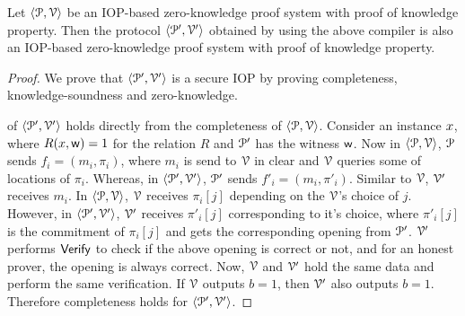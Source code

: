 \begin{lemma}\label{lemma:compiler}
	Let $\langle \mathcal{P},\mathcal{V}\rangle$ be an IOP-based zero-knowledge proof system with proof of knowledge property. Then the protocol $\langle \mathcal{P}',\mathcal{V}'\rangle$ obtained by using the above compiler is also an IOP-based zero-knowledge proof system with proof of knowledge property.
\end{lemma}
\begin{proof}
	
%	
%	
	
	We prove that $\langle \mathcal{P}',\mathcal{V}'\rangle$ is a secure IOP by proving completeness, knowledge-soundness and zero-knowledge.
	
	
	 of $\langle \mathcal{P}', \mathcal{V}' \rangle$ holds directly from the completeness of $\langle \mathcal{P}, \mathcal{V} \rangle$. 
	Consider an instance ${x}$, where $R({x},\mathsf{w}) = 1$ for the relation $R$ and $\mathcal{P}'$ has the witness $\mathsf{w}$. 
	Now in $\langle \mathcal{P},\mathcal{V}\rangle$, $\mathcal{P}$ sends $f_i = (m_i, \pi_i)$, where $m_i$ is send to $\mathcal{V}$ in clear and $\mathcal{V}$ queries some of locations of $\pi_i$. Whereas, in $\langle \mathcal{P}',\mathcal{V}'\rangle$, $\mathcal{P}'$ sends $f'_i = (m_i, \pi'_i)$. 
	Similar to $\mathcal{V}$, $\mathcal{V}'$ receives $m_i$. In $\langle \mathcal{P},\mathcal{V}\rangle$, $\mathcal{V}$ receives $\pi_i[j]$ depending on the $\mathcal{V}$'s choice of $j$. 
	However, in $\langle \mathcal{P}',\mathcal{V}'\rangle$, $\mathcal{V}'$ receives $\pi'_i[j]$ corresponding to it's choice, where $\pi'_i[j]$ is the commitment of $\pi_i[j]$ and gets the corresponding opening from $\mathcal{P}'$. 
	$\mathcal{V}'$ performs $\mathsf{Verify}$ to check if the above opening is correct or not, and for an honest prover, the opening is always correct.
	Now, $\mathcal{V}$ and $\mathcal{V}'$ hold the same data and perform the same verification. If $\mathcal{V}$ outputs $b = 1$, then $\mathcal{V}'$ also outputs $b = 1$. Therefore completeness holds for $\langle \mathcal{P}',\mathcal{V}'\rangle$.
	

\end{proof}
